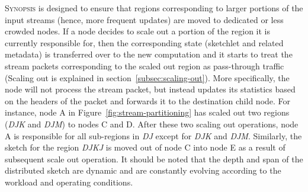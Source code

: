 \textsc{Synopsis} is designed to ensure that regions corresponding to larger portions of the input streams (hence, more frequent updates) are moved to dedicated or less crowded nodes.
If a node decides to scale out a portion of the region it is currently responsible for, then the corresponding state (sketchlet and related metadata) is transferred over to the new computation and it starts to treat the stream packets corresponding to the scaled out region as pass-through traffic (Scaling out is explained in section~\ref{subsec:scaling-out}).
More specifically, the node will not process the stream packet, but instead updates its statistics based on the headers of the packet and forwards it to the destination child node. 
For instance, node A in Figure~\ref{fig:stream-partitioning} has scaled out two regions (\emph{DJK} and \emph{DJM}) to nodes C and D.
After these two scaling out operations, node A is responsible for all sub-regions in \emph{DJ} except for \emph{DJK} and \emph{DJM}.
Similarly, the sketch for the region \emph{DJKJ} is moved out of node C into node E as a result of subsequent scale out operation.
It should be noted that the depth and span of the distributed sketch are dynamic and are constantly evolving according to the workload and operating conditions.

